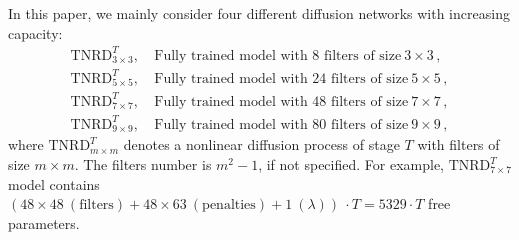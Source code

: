 \documentclass[10pt,journal,compsoc]{IEEEtran}
\begin{document}
In this paper, we mainly consider four different diffusion networks with increasing capacity: 
\begin{subequations}
\begin{align*}
        \text{TNRD}_{3 \times 3}^T, ~&\text{Fully trained model with 8 filters of size} ~3 \times 3\,,\\
        \text{TNRD}_{5 \times 5}^T, ~&\text{Fully trained model with 24 filters of size} ~5 \times 5\,,\\
        \text{TNRD}_{7 \times 7}^T, ~&\text{Fully trained model with 48 filters of size} ~7 \times 7\,, \\
  	 \text{TNRD}_{9 \times 9}^T, ~& \text{Fully trained model with 80 filters of size} ~9 \times 9\,,
\end{align*}
\end{subequations}
where $\text{TNRD}_{m \times m}^T$ denotes a nonlinear diffusion process of 
stage $T$ with filters of size $m \times m$. The filters number is $m^2 - 1$, 
if not specified. {For example, $\text{TNRD}_{7 \times 7}^T$ model contains 
$(48\times48 ~(\text{filters}) + 48\times63~ (\text{penalties}) + 1~ (
\lambda))~ \cdot T = 5329\cdot T$ free parameters. }
\end{document}
